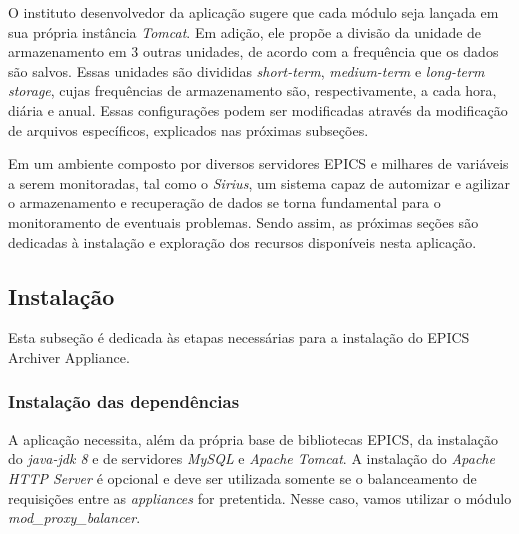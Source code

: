 \FloatBarrier

O instituto desenvolvedor da aplicação sugere que cada módulo seja lançada em
sua própria instância \textit{Tomcat}. Em adição, ele propõe a divisão da
unidade de armazenamento em 3 outras unidades, de acordo com a frequência que os
dados são salvos. Essas unidades são divididas \textit{short-term},
\textit{medium-term} e \textit{long-term storage}, cujas frequências de
armazenamento são, respectivamente, a cada hora, diária e anual. Essas
configurações podem ser modificadas através da modificação de arquivos
específicos, explicados nas próximas subseções.

\vspace{12pt}


Em um ambiente composto por diversos servidores EPICS e milhares de variáveis a
serem monitoradas, tal como o \textit{Sirius}, um sistema capaz de automizar e
agilizar o armazenamento e recuperação de dados se torna fundamental para o
monitoramento de eventuais problemas. Sendo assim, as próximas seções são
dedicadas à instalação e exploração dos recursos disponíveis nesta aplicação.
\subsection {Instalação}

Esta subseção é dedicada às etapas necessárias para a instalação do EPICS
Archiver Appliance.

\subsubsection {Instalação das dependências}
\label{ref:epics-install}
A aplicação necessita, além da própria base de bibliotecas EPICS, da
instalação do \textit{java-jdk 8} e de servidores \textit{MySQL} e
\textit{Apache Tomcat}. A instalação do \textit{Apache HTTP Server} é opcional e
deve ser utilizada somente se o balanceamento de requisições entre as
\textit{appliances} for pretentida. Nesse caso, vamos utilizar o módulo
\textit{mod\_proxy\_balancer}.

